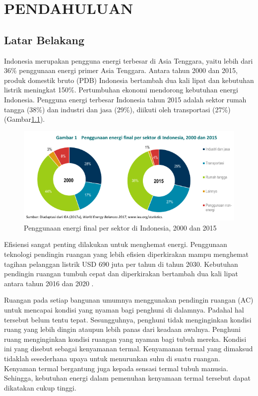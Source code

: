\chapter{PENDAHULUAN}\label{pendahuluan}
\section{Latar Belakang}\label{latar belakang}

Indonesia merupakan pengguna energi terbesar di Asia Tenggara, yaitu lebih dari 36\% penggunaan energi primer Asia Tenggara. Antara tahun 2000 dan 2015, produk domestik bruto (PDB) Indonesia bertambah dua kali lipat dan kebutuhan listrik meningkat 150\%. Pertumbuhan ekonomi mendorong kebutuhan energi Indonesia. Pengguna energi terbesar Indonesia tahun
2015 adalah sektor rumah tangga (38\%) dan industri dan jasa (29\%), diikuti oleh transportasi (27\%) (Gambar\ref{fig:1:energy}).
\begin{figure}[!h]
	\centering
	\includegraphics[width=1\textwidth]{figures/EnergyUsage}
	\caption{Penggunaan energi final per sektor di Indonesia, 2000 dan 2015}
	\label{fig:1:energy}
\end{figure}
Efisiensi sangat penting dilakukan untuk menghemat energi. Penggunaan teknologi pendingin ruangan yang lebih efisien diperkirakan mampu
menghemat tagihan pelanggan listrik USD 690 juta per tahun di tahun 2030. Kebutuhan
pendingin ruangan tumbuh cepat dan diperkirakan bertambah dua kali lipat antara tahun
2016 dan 2020 \cite{IEA}.

Ruangan pada setiap bangunan umumnya menggunakan pendingin ruangan (AC) untuk mencapai kondisi yang nyaman bagi penghuni di dalamnya. Padahal hal tersebut belum tentu tepat. Sesungguhnya, penghuni tidak menginginkan kondisi ruang yang lebih dingin ataupun lebih panas dari keadaan awalnya. Penghuni ruang menginginkan kondisi ruangan yang nyaman bagi tubuh mereka. Kondisi ini yang disebut sebagai kenyamanan termal. Kenyamanan termal yang dimaksud tidaklah sesederhana upaya untuk menurunkan suhu di suatu ruangan. Kenyaman termal bergantung juga kepada sensasi termal tubuh manusia. Sehingga, kebutuhan energi dalam pemenuhan kenyamaan termal tersebut dapat dikatakan cukup tinggi.

